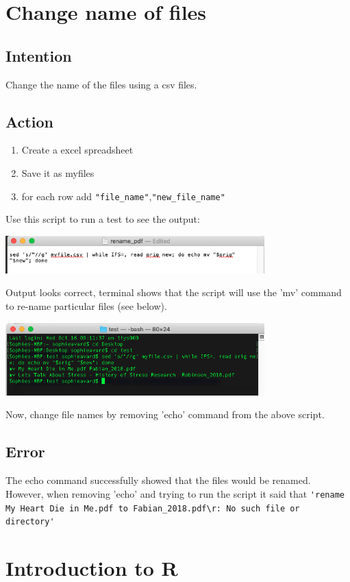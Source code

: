 \documentclass{article}
\begin{document}
\section{Change name of files}
\subsection{Intention}
Change the name of the files using a csv files.

\subsection{Action}
\begin{enumerate}
    \item Create a excel spreadsheet
    \item Save it as myfiles
    \item for each row add \verb|"file_name"|,\verb|"new_file_name"|
\end{enumerate}
Use this script to run a test to see the output:

\includegraphics[width=10cm]{echo_rename.png}

Output looks correct, terminal shows that the script will use the 'mv' command to re-name particular files (see below).

\includegraphics[width=10cm]{test.png}

Now, change file names by removing 'echo' command from the above script.

\subsection{Error}
The echo command successfully showed that the files would be renamed. However, when removing 'echo' and trying to run the script it said that
\verb|'rename My Heart Die in Me.pdf to Fabian_2018.pdf\r: No such file or directory'|

\section{Introduction to R}
\end{document}
